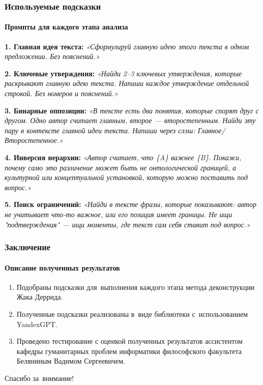 \documentclass{beamer}
\begin{document}
\begin{frame}
\frametitle{Используемые подсказки}
\framesubtitle{Промпты для каждого этапа анализа}

{\small

\textbf{1. Главная идея текста:}
\textit{«Сформулируй главную идею этого текста в одном предложении. Без пояснений.»}

\vspace{0.2cm}

\textbf{2. Ключевые утверждения:}
\textit{«Найди 2–3 ключевых утверждения, которые раскрывают главную идею текста. Напиши каждое утверждение отдельной строкой. Без номеров и пояснений.»}

\vspace{0.2cm}

\textbf{3. Бинарные оппозиции:}
\textit{«В тексте есть два понятия, которые спорят друг с другом. Одно автор считает главным, второе — второстепенным. Найди эту пару в контексте главной идеи текста. Напиши через слэш: Главное/Второстепенное.»}

\vspace{0.2cm}

\textbf{4. Инверсия иерархии:}
\textit{«Автор считает, что \{A\} важнее \{B\}. Покажи, почему само это различение может быть не онтологической границей, а культурной или концептуальной установкой, которую можно поставить под вопрос.»}

\vspace{0.2cm}

\textbf{5. Поиск ограничений:}
\textit{«Найди в тексте фразы, которые показывают: автор не учитывает что-то важное, или его позиция имеет границы. Не ищи "подтверждения" — ищи моменты, где текст сам себя ставит под вопрос.»}

}
\end{frame}

\begin{frame}
\frametitle{Заключение}
\framesubtitle{Описание полученных результатов}

\begin{enumerate}
\item{Подобраны подсказки для~выполнения каждого этапа метода деконструкции Жака Деррида.}
\item{Полученные подсказки реализованы в~виде библиотеки с~использованием YandexGPT.}
\item{Проведено тестирование с оценкой полученных результатов ассистентом кафедры гуманитарных проблем информатики философского факультета Беляниным Вадимом Сергеевичем.}
\end{enumerate}
\end{frame}

\begin{frame}
\begin{center}
{\Large Спасибо за~внимание!}
\end{center}
\end{frame}
\end{document}
